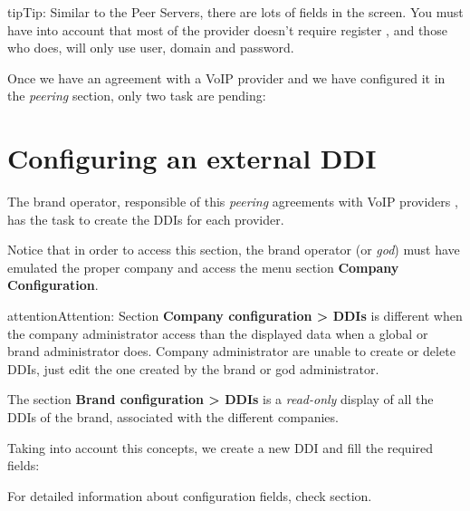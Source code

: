 \documentclass[letterpaper,10pt,english]{sphinxmanual}
\begin{document}
\begin{notice}{tip}{Tip:}
Similar to the Peer Servers, there are lots of fields in the screen.
You must have into account that most of the provider doesn't require register
, and those who does, will only use user, domain and password.
\end{notice}

Once we have an agreement with a VoIP provider and we have configured it in
the \emph{peering} section, only two task are pending:


\section{Configuring an external DDI}
\label{getting_started/external_incoming_calls/configure_ddi:settingup-ddi}\label{getting_started/external_incoming_calls/configure_ddi:configuring-an-external-ddi}\label{getting_started/external_incoming_calls/configure_ddi::doc}
The brand operator, responsible of this \emph{peering} agreements with VoIP providers
, has the task to create the DDIs for each provider.

Notice that in order to access this section, the brand operator (or \emph{god})
must have emulated the proper company and access the menu section \textbf{Company
Configuration}.

\begin{notice}{attention}{Attention:}
Section \textbf{Company configuration \textgreater{} DDIs} is different when the
company administrator access than the displayed data when a global or brand
administrator does. Company administrator are unable to create or delete
DDIs, just edit the one created by the brand or god administrator.
\end{notice}

The section \textbf{Brand configuration \textgreater{} DDIs} is a \emph{read-only} display of all the
DDIs of the brand, associated with the different companies.

Taking into account this concepts, we create a new DDI and fill the required
fields:

\label{getting_started/external_incoming_calls/configure_ddi:bill-inbound}
For detailed information about configuration fields, check {\hyperref[company/ddis:ddis]{}} section.
\end{document}
